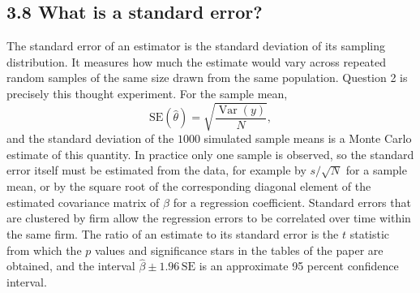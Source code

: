 \documentclass{HW} %
\newcommand{\Var}{\operatorname{Var}}
\begin{document}
\subsection*{3.8 What is a standard error?}
The standard error of an estimator is the standard deviation of its sampling distribution. It measures how much the estimate would vary across repeated random samples of the same size drawn from the same population. Question 2 is precisely this thought experiment. For the sample mean,
\[ \mathrm{SE}(\hat\theta) = \sqrt{\frac{\Var(y)}{N}}, \]
and the standard deviation of the $1000$ simulated sample means is a Monte Carlo estimate of this quantity. In practice only one sample is observed, so the standard error itself must be estimated from the data, for example by $s/\sqrt{N}$ for a sample mean, or by the square root of the corresponding diagonal element of the estimated covariance matrix of $\hat\beta$ for a regression coefficient. Standard errors that are clustered by firm allow the regression errors to be correlated over time within the same firm. The ratio of an estimate to its standard error is the $t$ statistic from which the $p$ values and significance stars in the tables of the paper are obtained, and the interval $\hat\beta \pm 1.96\,\mathrm{SE}$ is an approximate 95 percent confidence interval.
\end{document}

